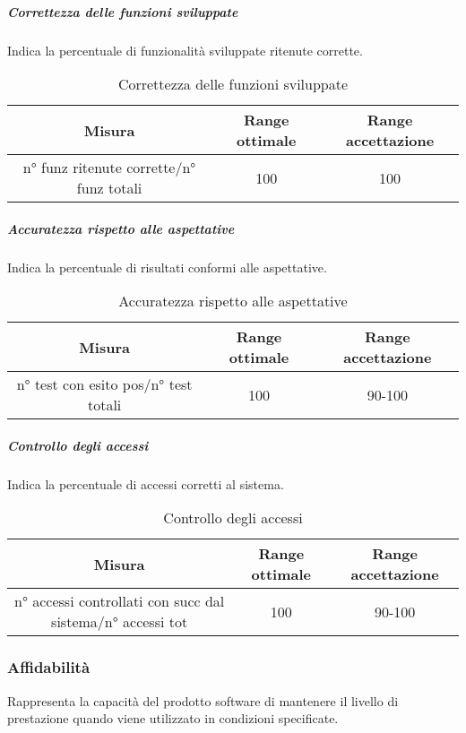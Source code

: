 			\subparagraph{Correttezza delle funzioni sviluppate}
			Indica la percentuale di funzionalità sviluppate ritenute corrette.
				\begin{table}[H]
					\begin{center}
						\begin{tabular}{|c|c|c|}
							\hline
							\textbf{Misura} & \textbf{Range ottimale} & \textbf{Range accettazione} \\
							\hline
							n° funz ritenute corrette/n° funz totali & 100 & 100 \\
							\hline
						\end{tabular}
					\end{center}
					\caption{Correttezza delle funzioni sviluppate}
				\end{table}
			
			\subparagraph{Accuratezza rispetto alle aspettative}
			Indica la percentuale di risultati conformi alle aspettative.
				\begin{table}[H]
					\begin{center}
						\begin{tabular}{|c|c|c|}
							\hline
							\textbf{Misura} & \textbf{Range ottimale} & \textbf{Range accettazione} \\
							\hline
							n° test con esito pos/n° test totali & 100 & 90-100 \\
							\hline
						\end{tabular}
					\end{center}
					\caption{Accuratezza rispetto alle aspettative}
				\end{table}
			
			\subparagraph{Controllo degli accessi}
			Indica la percentuale di accessi corretti al sistema.
			\begin{table}[H]
				\begin{center}
					\begin{tabular}{|c|c|c|}
						\hline
						\textbf{Misura} & \textbf{Range ottimale} & \textbf{Range accettazione} \\
						\hline
						n° accessi controllati con succ dal sistema/n° accessi tot & 100 & 90-100 \\
						\hline
					\end{tabular}
				\end{center}
				\caption{Controllo degli accessi}
			\end{table}
	
	\subsubsection{Affidabilità}
	Rappresenta la capacità del prodotto software di mantenere il livello di prestazione quando viene utilizzato in condizioni specificate.
		
